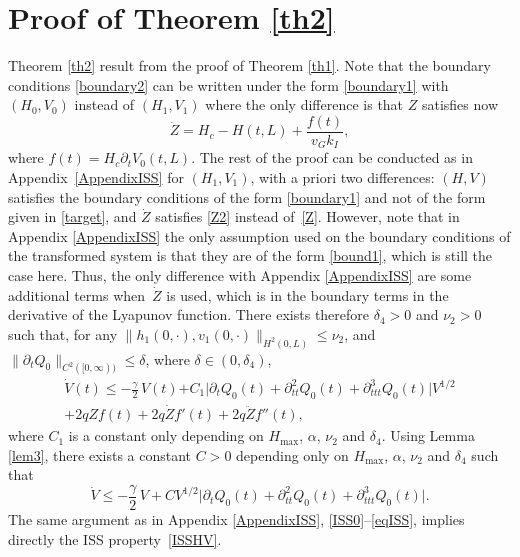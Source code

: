 \documentclass[11pt]{article}
\numberwithin{equation}{section}
\theoremstyle{definition}
\begin{document}
\section{Proof of Theorem \ref{th2}}
\label{ISS2}
Theorem \ref{th2} result from the proof of Theorem \ref{th1}. Note that the boundary conditions \eqref{boundary2} can be written under the form \eqref{boundary1} with $(H_{0},V_{0})$ instead of $(H_{1},V_{1})$
where the only difference is that $Z$ satisfies now
\begin{equation}
\dot Z=H_{c}-H(t,L)+\frac{f(t)}{v_{G}k_{I}},
\label{Z2}
\end{equation}
where $f(t)=H_{c}\partial_{t}V_{0}(t,L)$.
The rest of the proof can be conducted as in Appendix~\ref{AppendixISS} for $(H_{1},V_{1})$,
with a priori two differences: $(H,V)$ satisfies the boundary conditions of the form \eqref{boundary1} and not of the form given in \eqref{target},
and $\dot Z$ satisfies \eqref{Z2} instead of~\eqref{Z}. However,
note that in Appendix \ref{AppendixISS} the only assumption used on the boundary conditions of the transformed system is that they are of the form \eqref{bound1},
which is still the case here.
Thus,
the only difference with Appendix \ref{AppendixISS} are
some addi\-tional terms when~$\dot Z$ is used, which is in the boundary terms in the derivative of the Lyapunov function. There exists therefore $\delta_{4}>0$ and $\nu_{2}>0$ such that{, for any $\lVert h_{1}(0,\cdot),v_{1}(0,\cdot)\rVert_{H^{2}(0,L)}\leq \nu_{2}$,
and $\lVert\partial_{t}Q_{0}\rVert_{C^{2}([0,\infty))}\leq \delta$, where $\delta\in(0,\delta_{4})$,}
\begin{multline*}
\dot V(t)\leq -\frac{\gamma}{2}\,V(t)
{+C_{1}\bigl|\partial_{t}Q_{0}(t)+\partial_{tt}^{2}Q_{0}(t)+\partial_{ttt}^{3}Q_{0}(t)\bigr|V^{1/2}}\\
+2qZf(t)+2q\dot Zf'(t)+2q\ddot Zf''(t),
\end{multline*}
where $C_{1}$ is a constant only depending on $H_{\max}$, $\alpha$, $\nu_{2}$ and $\delta_{4}$. Using Lemma \ref{lem3},
there exists a constant $C>0$ depending only on $H_{\max}$, $\alpha$, $\nu_{2}$ and $\delta_{4}$ such that
\begin{equation*}
\dot V\leq -\frac{\gamma}{2}\,V+CV^{1/2}\bigl|\partial_{t}Q_{0}(t)+\partial_{tt}^{2}Q_{0}(t)+\partial_{ttt}^{3}Q_{0}(t)\bigr|.
\end{equation*}
The same argument as in Appendix \ref{AppendixISS}, \eqref{ISS0}--\eqref{eqISS}, implies directly the ISS property~\eqref{ISSHV}.
\end{document}
